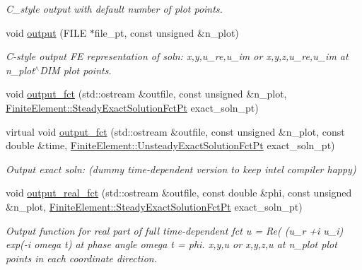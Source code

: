 \begin{DoxyCompactItemize}
\begin{DoxyCompactList}\small\item\em C\+\_\+style output with default number of plot points. \end{DoxyCompactList}\item 
void \hyperlink{classoomph_1_1PMLHelmholtzEquationsBase_a2b5f6565c5fe24c2d01e630b33a46334}{output} (F\+I\+LE $\ast$file\+\_\+pt, const unsigned \&n\+\_\+plot)
\begin{DoxyCompactList}\small\item\em C-\/style output FE representation of soln\+: x,y,u\+\_\+re,u\+\_\+im or x,y,z,u\+\_\+re,u\+\_\+im at n\+\_\+plot$^\wedge$\+D\+IM plot points. \end{DoxyCompactList}\item 
void \hyperlink{classoomph_1_1PMLHelmholtzEquationsBase_ab1e06aa6838bb7136d1517f31bb95d4d}{output\+\_\+fct} (std\+::ostream \&outfile, const unsigned \&n\+\_\+plot, \hyperlink{classoomph_1_1FiniteElement_a690fd33af26cc3e84f39bba6d5a85202}{Finite\+Element\+::\+Steady\+Exact\+Solution\+Fct\+Pt} exact\+\_\+soln\+\_\+pt)
\item 
virtual void \hyperlink{classoomph_1_1PMLHelmholtzEquationsBase_a5ecc9830498e4cc25a0898e676a8c0ef}{output\+\_\+fct} (std\+::ostream \&outfile, const unsigned \&n\+\_\+plot, const double \&time, \hyperlink{classoomph_1_1FiniteElement_ad4ecf2b61b158a4b4d351a60d23c633e}{Finite\+Element\+::\+Unsteady\+Exact\+Solution\+Fct\+Pt} exact\+\_\+soln\+\_\+pt)
\begin{DoxyCompactList}\small\item\em Output exact soln\+: (dummy time-\/dependent version to keep intel compiler happy) \end{DoxyCompactList}\item 
void \hyperlink{classoomph_1_1PMLHelmholtzEquationsBase_a84f505b170bda355042f0a56df1deb63}{output\+\_\+real\+\_\+fct} (std\+::ostream \&outfile, const double \&phi, const unsigned \&n\+\_\+plot, \hyperlink{classoomph_1_1FiniteElement_a690fd33af26cc3e84f39bba6d5a85202}{Finite\+Element\+::\+Steady\+Exact\+Solution\+Fct\+Pt} exact\+\_\+soln\+\_\+pt)
\begin{DoxyCompactList}\small\item\em Output function for real part of full time-\/dependent fct u = Re( (u\+\_\+r +i u\+\_\+i) exp(-\/i omega t) at phase angle omega t = phi. x,y,u or x,y,z,u at n\+\_\+plot plot points in each coordinate direction. \end{DoxyCompactList}\item 

\end{DoxyCompactItemize}
